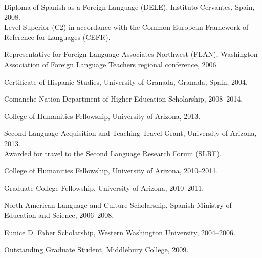 \documentclass[11pt]{article}
\begin{document}
\noindent Diploma of Spanish as a Foreign Language (DELE), Instituto Cervantes, Spain, 2008. \\ 
Level Superior (C2) in accordance with the Common European Framework of Reference for Languages (CEFR). \\ \vspace{-0.1in}

\noindent Representative for Foreign Language Associates Northwest (FLAN), Washington Association of Foreign Language Teachers regional conference, 2006. \\ \vspace{-0.1in}

\noindent Certificate of Hispanic Studies, University of Granada, Granada, Spain, 2004. 


\bigskip


\medskip
\noindent Comanche Nation Department of Higher Education Scholarship, 2008--2014. \\ \vspace{-0.1in} 

\noindent College of Humanities Fellowship, University of Arizona, 2013. \\ \vspace{-0.1in}

\noindent Second Language Acquisition and Teaching Travel Grant, University of Arizona, 2013. \\
Awarded for travel to the Second Language Research Forum (SLRF). \\ \vspace{-0.1in} 

\noindent College of Humanities Fellowship, University of Arizona, 2010--2011. \\ \vspace{-0.1in}

\noindent Graduate College Fellowship, University of Arizona, 2010--2011.\\ \vspace{-0.1in}

\noindent North American Language and Culture Scholarship, Spanish Ministry of Education and Science, 2006--2008. \\ \vspace{-0.1in}

\noindent Eunice D. Faber Scholarship, Western Washington University, 2004--2006.


\bigskip


\medskip
\noindent Outstanding Graduate Student, Middlebury College, 2009. \\ \vspace{-0.1in}
\end{document}
